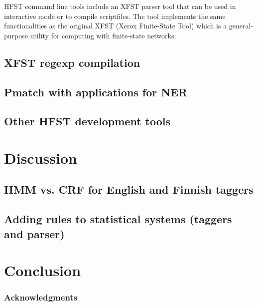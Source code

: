 \documentclass{llncs}
\begin{document}
HFST command line tools include an XFST parser tool that can be used in interactive
mode or to compile scriptfiles. The tool implements the same functionalities as the
original XFST (Xerox Finite-State Tool) which is a general-purpose utility for computing
with finite-state networks.


\subsection{XFST regexp compilation}

\subsection{Pmatch with applications for NER}

\subsection{Other HFST development tools}

\section{Discussion}\label{hfst:discussion}

\subsection{HMM vs. CRF for English and Finnish taggers}

\subsection{Adding rules to statistical systems (taggers and parser)}

\section{Conclusion}\label{hfst:conclusion}

\subsubsection*{Acknowledgments}



\end{document}
